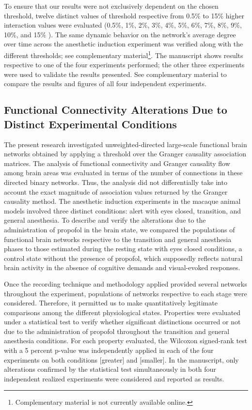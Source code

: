 \documentclass[twoside]{article}
\begin{document}
\begin{multicols}{2}
To ensure that our results were not exclusively dependent on the chosen threshold, twelve distinct values of threshold respective from 0.5\% to 15\% higher interaction values were evaluated (0.5\%, 1\%, 2\%, 3\%, 4\%, 5\%, 6\%, 7\%, 8\%, 9\%, 10\%, and 15\% ). The same dynamic behavior on the network's average degree over time across the anesthetic induction experiment was verified along with the different thresholds; see complementary material\footnote{Complementary material is not currently available online.}.
The manuscript shows results respective to one of the four experiments performed; the other three experiments were used to validate the results presented. See complementary material to compare the results and figures of all four independent experiments.


\subsection{Functional Connectivity Alterations Due to Distinct Experimental Conditions}


The present research investigated unweighted-directed large-scale functional brain networks obtained by applying a threshold over the Granger causality association matrices. The analysis of functional connectivity and Granger causality flow among brain areas was evaluated in terms of the number of connections in these directed binary networks. Thus, the analysis did not differentially take into account the exact magnitude of association values returned by the Granger causality method. 
The anesthetic induction experiments in the macaque animal models involved three distinct conditions: alert with eyes closed, transition, and general anesthesia. To describe and verify the alterations due to the administration of propofol in the brain state, we compared the populations of functional brain networks respective to the transition and general anesthesia phases to those estimated during the resting state with eyes closed conditions, a control state without the presence of propofol, which supposedly reflects natural brain activity in the absence of cognitive demands and visual-evoked responses.





Once the recording technique and methodology applied provided several networks throughout the experiment, populations of networks respective to each stage were considered. Therefore, it permitted us to make quantitatively legitimate comparisons among the different physiological states. Properties were evaluated under a statistical test to verify whether significant distinctions occurred or not due to the administration of propofol throughout the transition and general anesthesia conditions. 
For each property evaluated, the Wilcoxon signed-rank test with a 5 percent p-value was independently applied in each of the four experiments on both conditions [greater] and [smaller]. In the manuscript, only alterations confirmed by the statistical test simultaneously in both four independent realized experiments were considered and reported as results.


\end{multicols}
\end{document}
